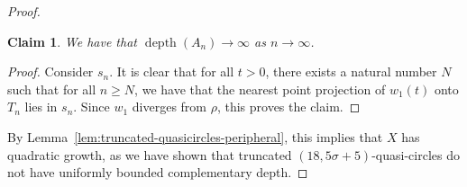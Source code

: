 \documentclass[11pt,a4paper]{amsart}
\newtheorem{claim}[theorem]{Claim}
\theoremstyle{definition}
\DeclareMathOperator{\depth}{depth}
\begin{document}
\begin{proof}
    
    


    \begin{claim}
        We have that $\depth(A_n) \to \infty$ as $n \to \infty$. 
    \end{claim}

    \begin{proof}
        Consider $s_n$. It is clear that for all $t > 0$, there exists a natural number $N$ such that for all $n \geq N$, we have that the nearest point projection of $w_1(t)$ onto $T_n$ lies in $s_n$. Since $w_1$ diverges from $\rho$, this proves the claim. 
    \end{proof}

    By Lemma~\ref{lem:truncated-quasicircles-peripheral}, this implies that $X$ has quadratic growth, as we have shown that  truncated $(18,5\sigma+5)$-quasi-circles do not have uniformly bounded complementary depth.
\end{proof}


\main*
\end{document}
